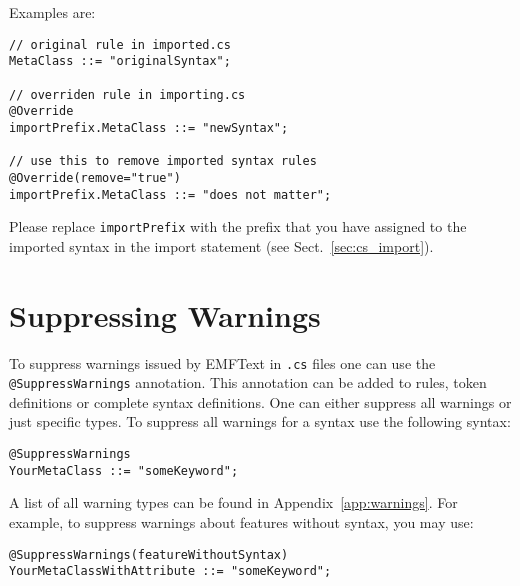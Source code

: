 Examples are:

\lstset{language=CS}
\begin{lstlisting}
// original rule in imported.cs
MetaClass ::= "originalSyntax";

// overriden rule in importing.cs
@Override
importPrefix.MetaClass ::= "newSyntax";

// use this to remove imported syntax rules
@Override(remove="true")
importPrefix.MetaClass ::= "does not matter";
\end{lstlisting}

Please replace \texttt{importPrefix} with the prefix that you have assigned to 
the imported syntax in the import statement (see Sect.~\ref{sec:cs_import}).

\section{Suppressing Warnings}

To suppress warnings issued by EMFText in \texttt{.cs} files one can use the
\texttt{@SuppressWarnings} annotation. This annotation can be added to rules,
token definitions or complete syntax definitions. One can either suppress all 
warnings or just specific types. To suppress all warnings for a syntax use the
following syntax:

\lstset{language=CS}
\begin{lstlisting}
@SuppressWarnings
YourMetaClass ::= "someKeyword";
\end{lstlisting}

A list of all warning types can be found in Appendix~\ref{app:warnings}. For
example, to suppress warnings about features without syntax, you may use:

\lstset{language=CS}
\begin{lstlisting}
@SuppressWarnings(featureWithoutSyntax)
YourMetaClassWithAttribute ::= "someKeyword";
\end{lstlisting}

